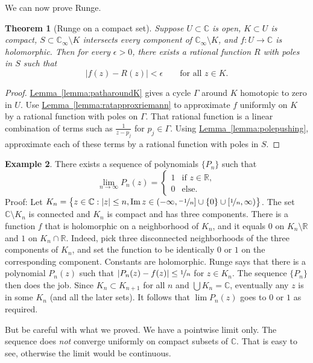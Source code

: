 \documentclass[12pt,openany]{book}
\renewcommand{\Im}{\operatorname{Im}}
\newcommand{\sabs}[1]{\lvert {#1} \rvert}
\newcommand{\abs}[1]{\left\lvert {#1} \right\rvert}
\newcommand{\C}{{\mathbb{C}}}
\newcommand{\R}{{\mathbb{R}}}
\theoremstyle{plain}
\newtheorem{thm}{Theorem}[section]
\theoremstyle{remark}
\theoremstyle{definition}
\theoremstyle{exercise}
\theoremstyle{example}
\newtheorem{example}[thm]{Example}
\newcommand{\lemmaref}[1]{\hyperref[#1]{Lemma~\ref*{#1}}}
\begin{document}
We can now prove Runge.

\begin{thm}[Runge on a compact set]%
\label{thm:rungecpt}
Suppose $U \subset \C$ is open, $K \subset U$ is compact, $S \subset \C_{\infty} \setminus K$
intersects every component of $\C_\infty \setminus K$,
and $f \colon U \to \C$ is holomorphic.
Then for every $\epsilon > 0$,
there exists a rational function $R$ with poles in $S$ such that
\begin{equation*}
\abs{f(z)-R(z)} < \epsilon \qquad \text{for all $z \in K$.}
\end{equation*}
\end{thm}

\begin{proof}
\lemmaref{lemma:patharoundK} gives a cycle $\Gamma$
around $K$ homotopic
to zero in $U$.  Use \lemmaref{lemma:ratapproxriemann} to approximate
$f$ uniformly on $K$ by a rational function with poles on $\Gamma$.
That rational function is a linear combination of
terms such as $\frac{1}{z-p_j}$ for $p_j \in \Gamma$.
Using \lemmaref{lemma:polepushing}, approximate each of these terms
by a rational function with poles in $S$.
\end{proof}

\begin{example}
There exists a sequence of polynomials $\{ P_n \}$ such that
\begin{equation*}
\lim_{n \to \infty} P_n(z)
=
\begin{cases}
1 & \text{if } z \in \R, \\
0 & \text{else.}
\end{cases}
\end{equation*}
Proof: Let $K_n = \bigl\{ z \in \C : \sabs{z} \leq n, \Im z \in
(-\infty,\nicefrac{-1}{n}] \cup \{ 0 \} \cup
[\nicefrac{1}{n},\infty) \bigr\}$.  The set $\C \setminus K_n$ is connected and
$K_n$ is compact and has three components.  There is a function $f$
that is holomorphic on a neighborhood of $K_n$, and it equals $0$ on $K_n \setminus \R$
and $1$ on $K_n \cap \R$.
Indeed, pick three disconnected neighborhoods of the three components of
$K_n$, and set the function to be identically $0$ or $1$ on the corresponding
component.  Constants are holomorphic.
Runge says that there is a polynomial $P_n(z)$ such that $\sabs{P_n(z)-f(z)}
\leq \nicefrac{1}{n}$ for $z \in K_n$.  The sequence $\{ P_n \}$ then does
the job.  Since $K_n \subset K_{n+1}$ for all $n$ and $\bigcup K_n = \C$,
eventually any $z$ is in some $K_n$ (and all the later sets).
It follows that $\lim P_n(z)$ goes to $0$ or $1$ as required.

But be careful with what we proved.  We have a pointwise limit only.  The sequence
does \emph{not} converge uniformly on compact subsets of $\C$.  That is easy to see,
otherwise the limit would be continuous.
\end{example}
\end{document}
